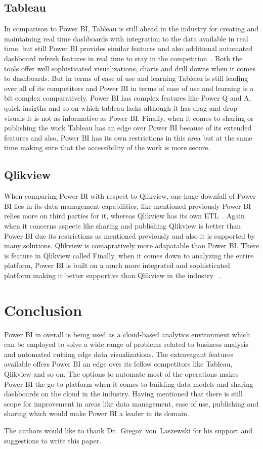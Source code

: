 \subsection{Tableau}
In comparison to Power BI, Tableau is still ahead in the industry for creating and 
maintaining real time dashboards with integration to the data available in real time, 
but still Power BI provides similar features and also additional automated dashboard
refresh features in real time to stay in the competition~\cite{hid-sp18-418-powerbi-comparison}. 
Both the tools offer well sophisticated visualizations, charts and drill downs when 
it comes to dashboards. But in terms of ease of use and learning Tableau is still 
leading over all of its competitors and Power BI in terms of ease of use and learning 
is a bit complex comparatively. Power BI has complex features like Power Q and A, quick 
insigths and so on which tableau lacks although it has drag and drop visuals it is 
not as informative as Power BI. Finally, when it comes to sharing or publishing the 
work Tableau has an edge over Power BI because of its extended features and also, 
Power BI has its own restrictions in this area but at the same time making sure that 
the accessibility of the work is more secure.   

\subsection{Qlikview}
When comparing Power BI with respect to Qlikview, one huge downfall of Power BI 
lies in its data management capabilities, like mentioned previously Power BI relies 
more on third parties for it, whereas Qlikview has its own ETL~\cite{hid-sp18-418-powerbi-comparison}. 
Again when it concerns aspects like sharing and publishing Qlikview is better than 
Power BI due its restrictions as mentioned previously and also it is supported by 
many solutions. Qlikview is comapratively more adapatable than Power BI. 
There is feature in Qlikview called Finally, when it comes down to analyzing the 
entire platform, Power BI is built on a much more integrated and sophisticated 
platform making it better supportive than Qlikview in the industry ~\cite{hid-sp18-418-powerbi-comparison}.

\section{Conclusion}
Power BI in overall is being used as a cloud-based analytics environment which 
can be employed to solve a wide range of problems related to business analysis 
and automated cutting edge data visualizations. The extravagant features 
available offers Power BI an edge over its fellow competitors like Tableau, 
Qlikview and so on. The options to automate most of the operations makes 
Power BI the go to platform when it comes to building data models and sharing 
dashboards on the cloud in the industry. Having mentioned that there is still scope
for improvement in areas like data management, ease of use, publishing and sharing 
which would make Power BI a leader in its domain.
 
\begin{acks}

The authors would like to thank Dr.~Gregor~von~Laszewski for his
support and suggestions to write this paper.

\end{acks}


 